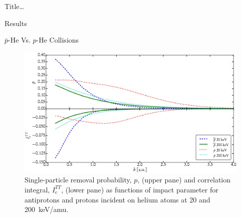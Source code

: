 \documentclass[letterpaper, 11 pt]{report}
\begin{document}
\begin{chapter}{ Title\dots \label{chap:p-he2p-he}}
\begin{section}{Results \label{sec:phe2p-res}}
\begin{subsection}{ \texorpdfstring{$\bar{p}$}{pbar}-He Vs. \texorpdfstring{$p$}{p}-He Collisions
                         \label{sec:pbarhe-res}}
         \begin{figure}[t]
            \centering
            \includegraphics[width = 0.95 \linewidth]{./images/p-ic.eps}
            \caption[Single-particle removal and correlation integral]
                    {Single-particle removal probability, $p$, (upper pane) and
                     correlation integral, $I_\mathrm{c}^{TT}$, (lower pane) as functions of impact
                     parameter for antiprotons and protons incident on helium atoms at 20 and
                     200~keV/amu. \label{fig:p-ic}}
         \end{figure}


\end{subsection}
\end{section}
\end{chapter}
\end{document}
